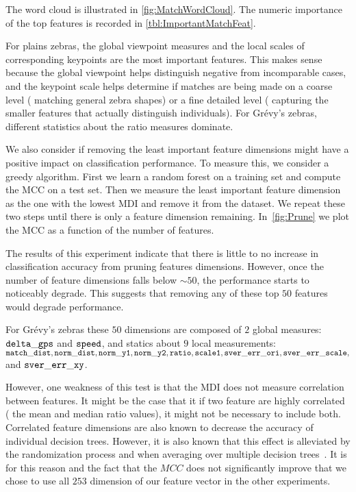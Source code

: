         The word cloud is illustrated in \cref{fig:MatchWordCloud}.
        The numeric importance of the top features is recorded in \cref{tbl:ImportantMatchFeat}.

        For plains zebras, the global viewpoint measures and the local scales of corresponding keypoints are the
          most important features.
        This makes sense because the global viewpoint helps distinguish negative from incomparable cases, and the
          keypoint scale helps determine if matches are being made on a coarse level (\eg{} matching general zebra
          shapes) or a fine detailed level (\ie{} capturing the smaller features that actually distinguish
          individuals).
        For Grévy's zebras, different statistics about the ratio measures dominate.

        \MatchWordCloud{}
        \ImportantMatchFeat{}

        We also consider if removing the least important feature dimensions might have a positive impact on
          classification performance.
        To measure this, we consider a greedy algorithm.
        First we learn a random forest on a training set and compute the MCC on a test set.
        Then we measure the least important feature dimension as the one with the lowest MDI and remove it from
          the dataset.
        We repeat these two steps until there is only a feature dimension remaining.
        In~\cref{fig:Prune} we plot the MCC as a function of the number of features.

        The results of this experiment indicate that there is little to no increase in classification accuracy
          from pruning features dimensions.
          However, once the number of feature dimensions falls below ${\sim}50$, the performance starts to noticeably
          degrade.
        This suggests that removing any of these top $50$ features would degrade performance. 

        For Grévy's zebras these $50$ dimensions are composed of $2$ global measures:
        $\tt{delta\_gps}$ and $\tt{speed}$, and statics about $9$ local measurements:
        $\tt{match\_dist, norm\_dist, norm\_y1, norm\_y2, ratio, scale1, sver\_err\_ori, sver\_err\_scale,}$ and
          $\tt{sver\_err\_xy}$.

        However, one weakness of this test is that the MDI does not measure correlation between features.
        It might be the case that it if two feature are highly correlated (\eg{} the mean and median ratio
          values), it might not be necessary to include both.
        Correlated feature dimensions are also known to decrease the accuracy of individual decision trees.
        However, it is also known that this effect is alleviated by the randomization process and when averaging
          over multiple decision trees~\cite{louppe2014understanding}.
        It is for this reason and the fact that the $MCC$ does not significantly improve that we chose to use all
          $253$ dimension of our feature vector in the other experiments.


